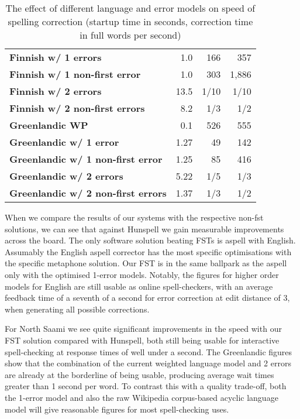 \documentclass[a4paper,12pt]{article}
\begin{document}
\begin{table}
\begin{tabular}{|l|r|r|r|}
        \bf Finnish w/ 1 errors   & 1.0  & 166 & 357   \\
\bf Finnish w/ 1 non-first error  & 1.0  & 303 & 1,886  \\
        \bf Finnish w/ 2 errors   & 13.5 & 1/10 & 1/10 \\
\bf Finnish w/ 2 non-first errors & 8.2  & 1/3  & 1/2 \\
        \hline
        \bf Greenlandic WP    & 0.1  & 526 & 555\\
        \hline
        \bf Greenlandic w/ 1 error    & 1.27 & 49 & 142 \\
\bf Greenlandic w/ 1 non-first error  & 1.25 & 85 & 416 \\
       \bf Greenlandic w/ 2 errors    & 5.22 & 1/5 & 1/3 \\
\bf Greenlandic w/ 2 non-first errors & 1.37 & 1/3 & 1/2 \\
        \hline
    \end{tabular}
    \caption{The effect of different language and error models on speed of
        spelling correction (startup time in seconds, correction time in 
        full words per second) \label{table:speed}}
\end{table}

When we compare the results of our systems with the respective non-fst
solutions, we can see that against Hunspell we gain measurable improvements
across the board. The only software solution beating FSTs is aspell with
English. Assumably the English aspell corrector has the most specific
optimisations with the specific metaphone solution. Our FST is in the same
ballpark as the aspell only with the optimised 1-error models.  Notably, the
figures for higher order models for English are still usable as online
spell-checkers, with an average feedback time of a seventh of a second for
error correction at edit distance of 3, when generating all possible
corrections.

For North Saami we see quite significant improvements in the speed with our FST
solution compared with Hunspell, both still being usable for interactive
spell-checking at response times of well under a second. The Greenlandic
figures show that the combination of the current weighted language model and 2
errors are already at the borderline of being usable, producing average wait
times greater than 1 second per word. To contrast this with a quality
trade-off, both the 1-error model and also the raw Wikipedia corpus-based
acyclic language model will give reasonable figures for most spell-checking
uses.
\end{document}
